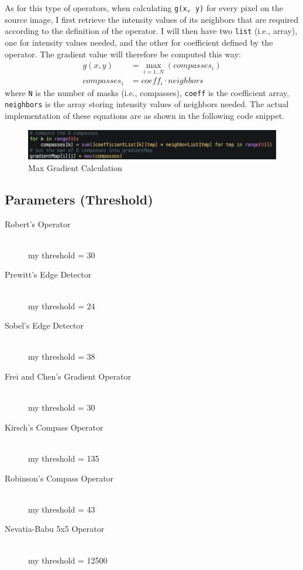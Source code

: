 \documentclass{article}
\newcommand{\code}[1]{\texttt{#1}}
\begin{document}
As for this type of operators, when calculating \code{g(x, y)} for every pixel on the source image, I first retrieve the intensity values of its neighbors that are required according to the definition of the operator. I will then have two \code{list} (i.e., array), one for intensity values needed, and the other for coefficient defined by the operator. The gradient value will therefore be computed this way:
\begin{align*}
g(x, y) &= \max_{i=1..N}(compasses_{i}) \\
compasses_{i} &= coeff_{i} \cdot neighbors
\end{align*}
where \code{N} is the number of masks (i.e., compasses), \code{coeff} is the coefficient array, \code{neighbors} is the array storing intensity values of neighbors needed. The actual implementation of these equations are as shown in the following code snippet.
\begin{figure}[H]
  \includegraphics[width=\linewidth]{img/max_gradient.png}
  \caption{Max Gradient Calculation}
  \label{fig:max_gradient}
\end{figure}

\subsection{Parameters (Threshold)}
\begin{description}
  \item[Robert's Operator] \hfill \\
  my threshold = 30
  \item[Prewitt's Edge Detector] \hfill \\
  my threshold = 24
  \item[Sobel's Edge Detector] \hfill \\
  my threshold = 38
  \item[Frei and Chen's Gradient Operator] \hfill \\
  my threshold = 30
  \item[Kirsch's Compass Operator] \hfill \\
  my threshold = 135
  \item[Robinson's Compass Operator] \hfill \\
  my threshold = 43
  \item[Nevatia-Babu 5x5 Operator] \hfill \\
  my threshold = 12500
\end{description}
\end{document}
